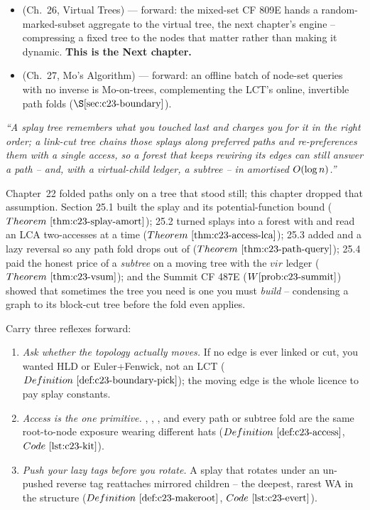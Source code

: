 \begin{itemize}[nosep, leftmargin=1.4em]
        nothing on pure DP specs (\(\secref{c23-boundary}\)).
  \item {} (Ch.~26, Virtual Trees) --- forward: the mixed-set CF 809E hands a random-marked-subset
        aggregate to the virtual tree, the next chapter's engine -- compressing a fixed tree to the nodes
        that matter rather than making it dynamic. \textbf{This is the Next chapter.}
  \item {} (Ch.~27, Mo's Algorithm) --- forward: an offline batch of node-set queries with no
        inverse is Mo-on-trees, complementing the LCT's online, invertible path folds
        (\(\secref{c23-boundary}\)).
\end{itemize}

\begin{lastword}
\emph{``A splay tree remembers what you touched last and charges you for it in the right order; a
link-cut tree chains those splays along preferred paths and re-preferences them with a single access,
so a forest that keeps rewiring its edges can still answer a path -- and, with a virtual-child ledger,
a subtree -- in amortised \(O(\log n)\).''}

\medskip
Chapter~22 folded paths only on a tree that stood still; this chapter dropped that assumption. Section
25.1 built the splay and its potential-function bound (\(\thmref{c23-splay-amort}\)); 25.2 turned
splays into a forest with  and read an LCA two-accesses at a time
(\(\thmref{c23-access-lca}\)); 25.3 added  and a lazy reversal so any path fold drops out
of  (\(\thmref{c23-path-query}\)); 25.4 paid the honest price of a \emph{subtree} on a
moving tree with the \(\mathit{vir}\) ledger (\(\thmref{c23-vsum}\)); and the Summit CF 487E
(\(\probref{c23-summit}\)) showed that sometimes the tree you need is one you must \emph{build} --
condensing a graph to its block-cut tree before the fold even applies.

\medskip
Carry three reflexes forward:
\begin{enumerate}[nosep, leftmargin=1.6em]
  \item \emph{Ask whether the topology actually moves.} If no edge is ever linked or cut, you wanted
        HLD or Euler+Fenwick, not an LCT (\(\defref{c23-boundary-pick}\)); the moving edge is the whole
        licence to pay splay constants.
  \item \emph{Access is the one primitive.} , , , 
        and every path or subtree fold are the same root-to-node exposure wearing different hats
        (\(\defref{c23-access}\), \(\coderef{c23-kit}\)).
  \item \emph{Push your lazy tags before you rotate.} A splay that rotates under an un-pushed reverse
        tag reattaches mirrored children -- the deepest, rarest WA in the structure
        (\(\defref{c23-makeroot}\), \(\coderef{c23-evert}\)).
\end{enumerate}


\end{lastword}
